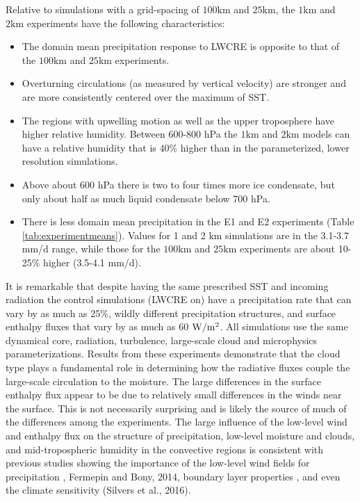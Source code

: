 \documentclass[draft]{agujournal2019}
\begin{document}
{Relative to simulations with a grid-spacing of $100 \textrm{km}$ and $25 \textrm{km}$, the $1 \textrm{km}$ and 
$2 \textrm{km}$ experiments have the following characteristics: 
\begin{itemize}
  \item The domain mean precipitation response to LWCRE is opposite to that of the $100 \textrm{km}$ 
  and $25 \textrm{km}$ experiments.
  \item Overturning circulations (as measured by vertical velocity) are stronger and are more consistently centered 
  over the maximum of SST.  
  \item The regions with upwelling motion as well as the upper troposphere have higher relative humidity.   
  Between 600-800 hPa the $1 \textrm{km}$ and $2 \textrm{km}$ models can have a relative humidity 
  that is 40\% higher than in the parameterized, lower resolution simulations.  
  \item Above about 600 hPa there is two to four times more ice condensate, but only about half as much liquid condensate below 700 hPa.
  \item There is less domain mean precipitation in the E1 and E2 experiments (Table \ref{tab:experimentmeans}).  Values for 1 and 2 km simulations are in the 3.1-3.7 mm/d range, while those 
  for the $100 \textrm{km}$ and $25 \textrm{km}$ experiments are about 10-25\% higher (3.5-4.1 mm/d).  
\end{itemize}

It is remarkable that despite having the same prescribed SST and incoming radiation
the control simulations (LWCRE on) have a precipitation rate  that can vary by as much as 
25\%, wildly different precipitation structures, and surface enthalpy fluxes that vary by as much as 
60 $\rm{W/m^2}$.
All simulations use the same dynamical core, radiation, turbulence, large-scale cloud and microphysics parameterizations.  
Results from these experiments demonstrate that the cloud type
plays a fundamental role in determining how the radiative fluxes couple
the large-scale circulation to the moisture.  The large differences in the surface enthalpy flux
appear to be due to relatively small differences in the winds near the surface.  This is not necessarily
surprising and is likely the source of much of the differences among the experiments.  The 
large influence of the low-level wind  and enthalpy flux on the structure of precipitation, 
low-level moisture and clouds, and mid-tropospheric humidity in the convective regions is 
consistent with previous studies showing the importance of the low-level wind fields for precipitation 
\cite{Wofsy_Kuang_2012}, Fermepin and Bony, 2014, boundary layer properties \cite{Raymond_1994}, and even the climate 
sensitivity (Silvers et al., 2016).  

}
\end{document}
